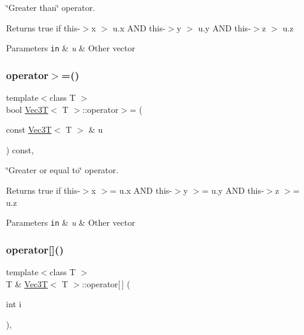 \char`\"{}\+Greater than\char`\"{} operator. 

Returns true if this-\/$>$x $>$ u.\+x A\+ND this-\/$>$y $>$ u.\+y A\+ND this-\/$>$z $>$ u.\+z 
\begin{DoxyParams}[1]{Parameters}
\mbox{\tt in}  & {\em u} & Other vector \\
\hline
\end{DoxyParams}
\mbox{\label{classVec3T_a3296f8319642088e08bd2d3e253fcd64}} 
\subsubsection{\texorpdfstring{operator$>$=()}{operator>=()}}
{\footnotesize\ttfamily template$<$class T $>$ \\
bool \hyperlink{classVec3T}{Vec3T}$<$ T $>$\+::operator$>$= (\begin{DoxyParamCaption}\item[{const \hyperlink{classVec3T}{Vec3T}$<$ T $>$ \&}]{u }\end{DoxyParamCaption}) const\hspace{0.3cm}{\ttfamily [inline]}, {\ttfamily [noexcept]}}



\char`\"{}\+Greater or equal to\char`\"{} operator. 

Returns true if this-\/$>$x $>$= u.\+x A\+ND this-\/$>$y $>$= u.\+y A\+ND this-\/$>$z $>$= u.\+z 
\begin{DoxyParams}[1]{Parameters}
\mbox{\tt in}  & {\em u} & Other vector \\
\hline
\end{DoxyParams}
\mbox{\label{classVec3T_a098a19968b6c7b0b76c2572e5236a71a}} 
\subsubsection{\texorpdfstring{operator[]()}{operator[]()}\hspace{0.1cm}{\footnotesize\ttfamily [1/2]}}
{\footnotesize\ttfamily template$<$class T $>$ \\
T \& \hyperlink{classVec3T}{Vec3T}$<$ T $>$\+::operator\mbox{[}$\,$\mbox{]} (\begin{DoxyParamCaption}\item[{int}]{i }\end{DoxyParamCaption})\hspace{0.3cm}{\ttfamily [inline]}, {\ttfamily [noexcept]}}



